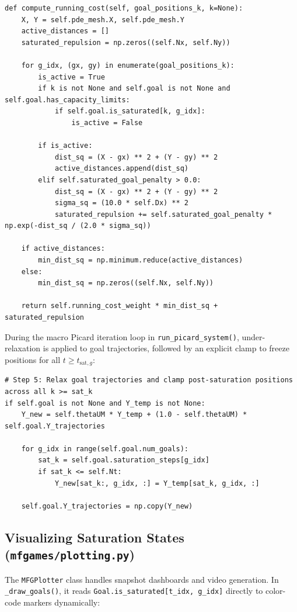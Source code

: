 \documentclass[11pt,a4paper]{article}
\begin{document}
\begin{verbatim}
def compute_running_cost(self, goal_positions_k, k=None):
    X, Y = self.pde_mesh.X, self.pde_mesh.Y
    active_distances = []
    saturated_repulsion = np.zeros((self.Nx, self.Ny))

    for g_idx, (gx, gy) in enumerate(goal_positions_k):
        is_active = True
        if k is not None and self.goal is not None and self.goal.has_capacity_limits:
            if self.goal.is_saturated[k, g_idx]:
                is_active = False

        if is_active:
            dist_sq = (X - gx) ** 2 + (Y - gy) ** 2
            active_distances.append(dist_sq)
        elif self.saturated_goal_penalty > 0.0:
            dist_sq = (X - gx) ** 2 + (Y - gy) ** 2
            sigma_sq = (10.0 * self.Dx) ** 2
            saturated_repulsion += self.saturated_goal_penalty * np.exp(-dist_sq / (2.0 * sigma_sq))

    if active_distances:
        min_dist_sq = np.minimum.reduce(active_distances)
    else:
        min_dist_sq = np.zeros((self.Nx, self.Ny))

    return self.running_cost_weight * min_dist_sq + saturated_repulsion
\end{verbatim}

During the macro Picard iteration loop in \texttt{run_picard_system()}, under-relaxation is applied to goal trajectories, followed by an explicit clamp to freeze positions for all $t \ge t_{\text{sat}, g}$:

\begin{verbatim}
# Step 5: Relax goal trajectories and clamp post-saturation positions across all k >= sat_k
if self.goal is not None and Y_temp is not None:
    Y_new = self.thetaUM * Y_temp + (1.0 - self.thetaUM) * self.goal.Y_trajectories

    for g_idx in range(self.goal.num_goals):
        sat_k = self.goal.saturation_steps[g_idx]
        if sat_k <= self.Nt:
            Y_new[sat_k:, g_idx, :] = Y_temp[sat_k, g_idx, :]

    self.goal.Y_trajectories = np.copy(Y_new)
\end{verbatim}

\subsection{Visualizing Saturation States (\texttt{mfgames/plotting.py})}
The \texttt{MFGPlotter} class handles snapshot dashboards and video generation. In \texttt{_draw_goals()}, it reads \texttt{Goal.is_saturated[t_idx, g_idx]} directly to color-code markers dynamically:
\end{document}
